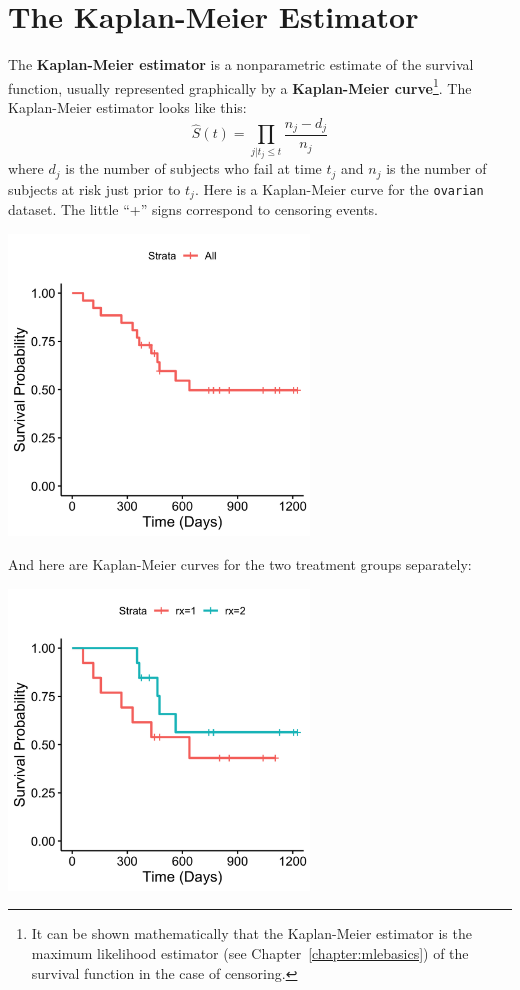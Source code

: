 \section{The Kaplan-Meier Estimator}

The \textbf{Kaplan-Meier estimator} is a nonparametric estimate of the survival function, usually represented graphically by a \textbf{Kaplan-Meier curve}\footnote{It can be shown mathematically that the Kaplan-Meier estimator is the maximum likelihood estimator (see Chapter~\ref{chapter:mlebasics}) of the survival function in the case of censoring.}. The Kaplan-Meier estimator looks like this:
$$ \hat{S}(t) = \prod_{j|t_j \leq t} \frac{n_j - d_j}{n_j} $$
where $d_j$ is the number of subjects who fail at time $t_j$ and $n_j$ is the number of subjects at risk just prior to $t_j$. Here is a Kaplan-Meier curve for the \texttt{ovarian} dataset. The little ``+'' signs correspond to censoring events.
\begin{center}
\includegraphics[width=0.6\textwidth]{img/ovarian-km-curve.png}
\end{center}
And here are Kaplan-Meier curves for the two treatment groups separately:
\begin{center}
\includegraphics[width=0.6\textwidth]{img/ovarian-km-curve-rx.png}
\end{center}
\vspace{5mm}

